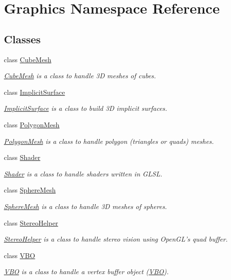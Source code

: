 \hypertarget{namespace_graphics}{
\section{Graphics Namespace Reference}
\label{namespace_graphics}
}
\subsection*{Classes}
\begin{DoxyCompactItemize}
\item 
class \hyperlink{class_graphics_1_1_cube_mesh}{CubeMesh}
\begin{DoxyCompactList}\small\item\em \hyperlink{class_graphics_1_1_cube_mesh}{CubeMesh} is a class to handle 3D meshes of cubes. \end{DoxyCompactList}\item 
class \hyperlink{class_graphics_1_1_implicit_surface}{ImplicitSurface}
\begin{DoxyCompactList}\small\item\em \hyperlink{class_graphics_1_1_implicit_surface}{ImplicitSurface} is a class to build 3D implicit surfaces. \end{DoxyCompactList}\item 
class \hyperlink{class_graphics_1_1_polygon_mesh}{PolygonMesh}
\begin{DoxyCompactList}\small\item\em \hyperlink{class_graphics_1_1_polygon_mesh}{PolygonMesh} is a class to handle polygon (triangles or quads) meshes. \end{DoxyCompactList}\item 
class \hyperlink{class_graphics_1_1_shader}{Shader}
\begin{DoxyCompactList}\small\item\em \hyperlink{class_graphics_1_1_shader}{Shader} is a class to handle shaders written in GLSL. \end{DoxyCompactList}\item 
class \hyperlink{class_graphics_1_1_sphere_mesh}{SphereMesh}
\begin{DoxyCompactList}\small\item\em \hyperlink{class_graphics_1_1_sphere_mesh}{SphereMesh} is a class to handle 3D meshes of spheres. \end{DoxyCompactList}\item 
class \hyperlink{class_graphics_1_1_stereo_helper}{StereoHelper}
\begin{DoxyCompactList}\small\item\em \hyperlink{class_graphics_1_1_stereo_helper}{StereoHelper} is a class to handle stereo vision using OpenGL's quad buffer. \end{DoxyCompactList}\item 
class \hyperlink{class_graphics_1_1_v_b_o}{VBO}
\begin{DoxyCompactList}\small\item\em \hyperlink{class_graphics_1_1_v_b_o}{VBO} is a class to handle a vertex buffer object (\hyperlink{class_graphics_1_1_v_b_o}{VBO}). \end{DoxyCompactList}\end{DoxyCompactItemize}
